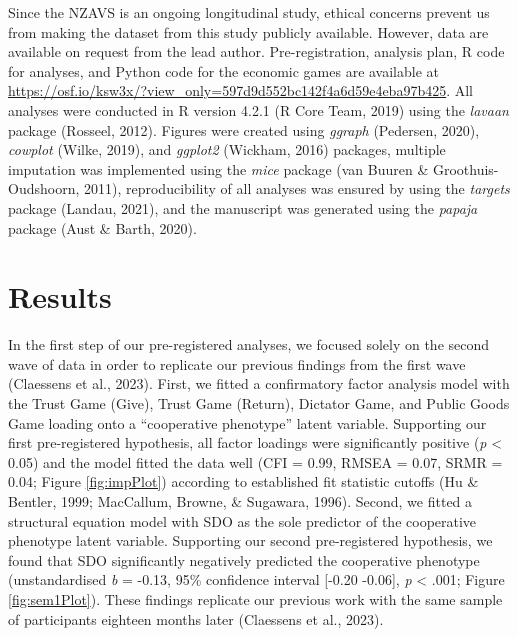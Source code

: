 \documentclass[
  man,floatsintext]{apa6}
\begin{document}
Since the NZAVS is an ongoing longitudinal study, ethical concerns prevent us from making the dataset from this study publicly available. However, data are available on request from the lead author. Pre-registration, analysis plan, R code for analyses, and Python code for the economic games are available at \url{https://osf.io/ksw3x/?view_only=597d9d552bc142f4a6d59e4eba97b425}. All analyses were conducted in R version 4.2.1 (R Core Team, 2019) using the \emph{lavaan} package (Rosseel, 2012). Figures were created using \emph{ggraph} (Pedersen, 2020), \emph{cowplot} (Wilke, 2019), and \emph{ggplot2} (Wickham, 2016) packages, multiple imputation was implemented using the \emph{mice} package (van Buuren \& Groothuis-Oudshoorn, 2011), reproducibility of all analyses was ensured by using the \emph{targets} package (Landau, 2021), and the manuscript was generated using the \emph{papaja} package (Aust \& Barth, 2020).

\hypertarget{results}{%
\section{Results}\label{results}}

In the first step of our pre-registered analyses, we focused solely on the second wave of data in order to replicate our previous findings from the first wave (Claessens et al., 2023). First, we fitted a confirmatory factor analysis model with the Trust Game (Give), Trust Game (Return), Dictator Game, and Public Goods Game loading onto a ``cooperative phenotype'' latent variable. Supporting our first pre-registered hypothesis, all factor loadings were significantly positive (\emph{p} \textless{} 0.05) and the model fitted the data well (CFI = 0.99, RMSEA = 0.07, SRMR = 0.04; Figure \ref{fig:impPlot}) according to established fit statistic cutoffs (Hu \& Bentler, 1999; MacCallum, Browne, \& Sugawara, 1996). Second, we fitted a structural equation model with SDO as the sole predictor of the cooperative phenotype latent variable. Supporting our second pre-registered hypothesis, we found that SDO significantly negatively predicted the cooperative phenotype (unstandardised \emph{b} = -0.13, 95\% confidence interval {[}-0.20 -0.06{]}, \emph{p} \textless{} .001; Figure \ref{fig:sem1Plot}). These findings replicate our previous work with the same sample of participants eighteen months later (Claessens et al., 2023).
\end{document}
